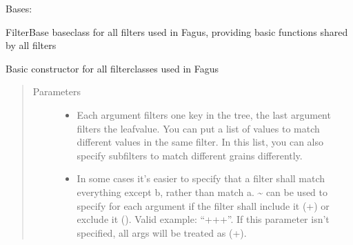 \documentclass[a4paper,10pt,english]{sphinxmanual}
\begin{document}
\begin{fulllineitems}
\label{\detokenize{fagus.filters:fagus.filters.FilBase}}
\pysigstartsignatures
{}
\pysigstopsignatures
\sphinxAtStartPar
Bases: 

\sphinxAtStartPar
FilterBase \sphinxhyphen{} base\sphinxhyphen{}class for all filters used in Fagus, providing basic functions shared by all filters

\begin{fulllineitems}
\label{\detokenize{fagus.filters:fagus.filters.FilBase.__init__}}
\pysigstartsignatures
{}
\pysigstopsignatures
\sphinxAtStartPar
Basic constructor for all filter\sphinxhyphen{}classes used in Fagus
\begin{quote}\begin{description}
\item[{Parameters}] \leavevmode\begin{itemize}
\item {}
\sphinxAtStartPar
{} \textendash{} Each argument filters one key in the tree, the last argument filters the leaf\sphinxhyphen{}value. You can
put a list of values to match different values in the same filter. In this list, you can also specify
subfilters to match different grains differently.

\item {}
\sphinxAtStartPar
{} \textendash{} In some cases it’s easier to specify that a filter shall match everything except b, rather than
match a. \textasciitilde{} can be used to specify for each argument if the filter shall include it (+) or exclude it
(\sphinxhyphen{}). Valid example: “++\sphinxhyphen{}+”. If this parameter isn’t specified, all args will be treated as (+).


\end{itemize}
\end{description}
\end{quote}
\end{fulllineitems}
\end{fulllineitems}
\end{document}
